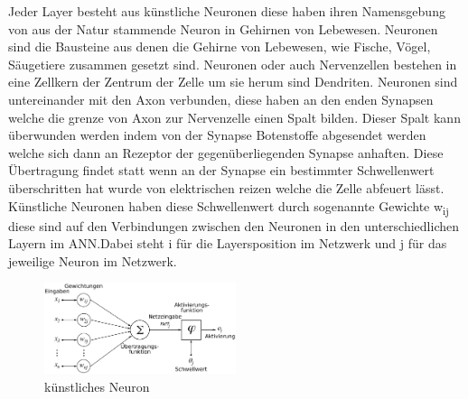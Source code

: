 \documentclass{llncs}
\begin{document}
	Jeder Layer besteht aus künstliche Neuronen diese haben ihren Namensgebung von aus der Natur stammende Neuron in Gehirnen von Lebewesen. Neuronen sind die Bausteine aus denen die Gehirne von Lebewesen, wie Fische, Vögel, Säugetiere zusammen gesetzt sind. Neuronen oder auch Nervenzellen bestehen in eine Zellkern der Zentrum der Zelle um sie herum sind Dendriten. Neuronen sind untereinander mit den Axon verbunden, diese haben an den enden Synapsen welche die grenze von Axon zur Nervenzelle einen Spalt bilden. Dieser Spalt kann überwunden werden indem von der Synapse Botenstoffe abgesendet werden welche sich dann an Rezeptor der gegenüberliegenden Synapse anhaften. Diese Übertragung findet statt wenn an der Synapse ein bestimmter Schwellenwert überschritten hat wurde von elektrischen reizen welche die Zelle abfeuert lässt. Künstliche Neuronen haben diese Schwellenwert durch sogenannte Gewichte w\textsubscript{ij} diese sind auf den Verbindungen zwischen den Neuronen in den unterschiedlichen Layern im ANN.Dabei steht i für die Layersposition im Netzwerk und j für das jeweilige Neuron im Netzwerk. 
	
	\begin{figure}[htbp] 
		\centering
		\includegraphics[width=0.5\textwidth]{Neuron.png}
		\caption{künstliches Neuron}
		\label{fig:Bild2}
	\end{figure}
	
\end{document}
